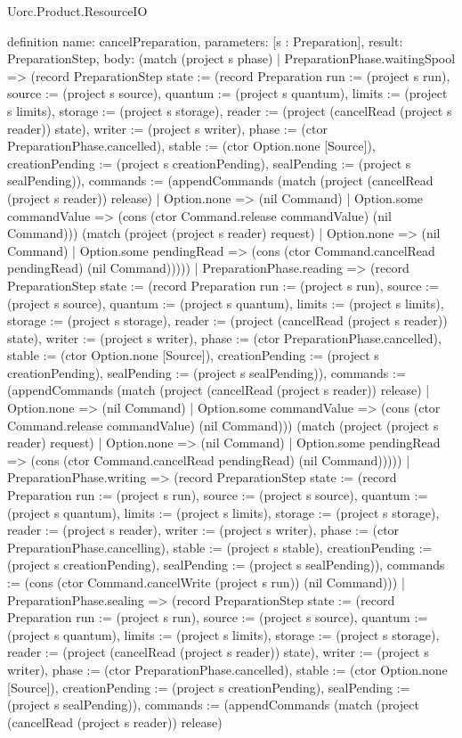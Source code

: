\begin{lexlean}{Uorc.Product.ResourceIO}
\begin{semanticmodule}
definition{
  name: cancelPreparation,
  parameters: [s : Preparation],
  result: PreparationStep,
  body: (match (project s phase)
    | PreparationPhase.waitingSpool => (record PreparationStep {state := (record Preparation {run := (project s run), source := (project s source), quantum := (project s quantum), limits := (project s limits), storage := (project s storage), reader := (project (cancelRead (project s reader)) state), writer := (project s writer), phase := (ctor PreparationPhase.cancelled), stable := (ctor Option.none [Source]), creationPending := (project s creationPending), sealPending := (project s sealPending)}), commands := (appendCommands (match (project (cancelRead (project s reader)) release)
      | Option.none => (nil Command)
      | Option.some commandValue => (cons (ctor Command.release commandValue) (nil Command))) (match (project (project s reader) request)
      | Option.none => (nil Command)
      | Option.some pendingRead => (cons (ctor Command.cancelRead pendingRead) (nil Command))))})
    | PreparationPhase.reading => (record PreparationStep {state := (record Preparation {run := (project s run), source := (project s source), quantum := (project s quantum), limits := (project s limits), storage := (project s storage), reader := (project (cancelRead (project s reader)) state), writer := (project s writer), phase := (ctor PreparationPhase.cancelled), stable := (ctor Option.none [Source]), creationPending := (project s creationPending), sealPending := (project s sealPending)}), commands := (appendCommands (match (project (cancelRead (project s reader)) release)
      | Option.none => (nil Command)
      | Option.some commandValue => (cons (ctor Command.release commandValue) (nil Command))) (match (project (project s reader) request)
      | Option.none => (nil Command)
      | Option.some pendingRead => (cons (ctor Command.cancelRead pendingRead) (nil Command))))})
    | PreparationPhase.writing => (record PreparationStep {state := (record Preparation {run := (project s run), source := (project s source), quantum := (project s quantum), limits := (project s limits), storage := (project s storage), reader := (project s reader), writer := (project s writer), phase := (ctor PreparationPhase.cancelling), stable := (project s stable), creationPending := (project s creationPending), sealPending := (project s sealPending)}), commands := (cons (ctor Command.cancelWrite (project s run)) (nil Command))})
    | PreparationPhase.sealing => (record PreparationStep {state := (record Preparation {run := (project s run), source := (project s source), quantum := (project s quantum), limits := (project s limits), storage := (project s storage), reader := (project (cancelRead (project s reader)) state), writer := (project s writer), phase := (ctor PreparationPhase.cancelled), stable := (ctor Option.none [Source]), creationPending := (project s creationPending), sealPending := (project s sealPending)}), commands := (appendCommands (match (project (cancelRead (project s reader)) release)
}}
\end{semanticmodule}
\end{lexlean}
